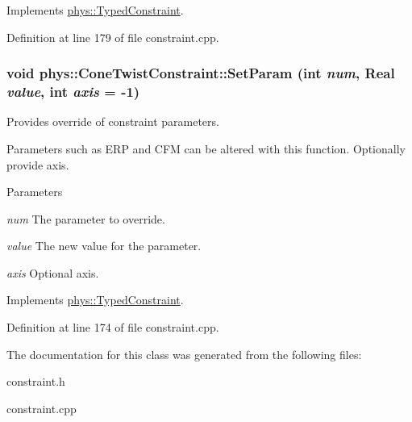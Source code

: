 Implements \hyperlink{classphys_1_1TypedConstraint_ab6140d40e9476c3dc46e2802e8097421}{phys::TypedConstraint}.



Definition at line 179 of file constraint.cpp.

\hypertarget{classphys_1_1ConeTwistConstraint_a555fc33b10a0c156e0ac93b94587098a}{
\subsubsection[{SetParam}]{\setlength{\rightskip}{0pt plus 5cm}void phys::ConeTwistConstraint::SetParam (int {\em num}, \/  {\bf Real} {\em value}, \/  int {\em axis} = {\ttfamily -\/1})}}
\label{da/dbc/classphys_1_1ConeTwistConstraint_a555fc33b10a0c156e0ac93b94587098a}


Provides override of constraint parameters. 

Parameters such as ERP and CFM can be altered with this function. Optionally provide axis. 
\begin{DoxyParams}{Parameters}
\item[{\em num}]The parameter to override. \item[{\em value}]The new value for the parameter. \item[{\em axis}]Optional axis. \end{DoxyParams}


Implements \hyperlink{classphys_1_1TypedConstraint_a31a20a74094f0cb8e4f82d1f99725415}{phys::TypedConstraint}.



Definition at line 174 of file constraint.cpp.



The documentation for this class was generated from the following files:\begin{DoxyCompactItemize}
\item 
constraint.h\item 
constraint.cpp\end{DoxyCompactItemize}

